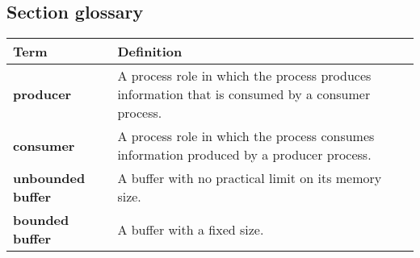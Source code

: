 \subsection*{Section glossary}
\centering
\begin{tabular}{>{\raggedright}p{} >{\raggedright\arraybackslash}p{}}
\toprule
\textbf{Term} & \textbf{Definition} \\
\midrule
\textbf{producer} & A process role in which the process produces information that is consumed by a consumer process. \\
\textbf{consumer} & A process role in which the process consumes information produced by a producer process. \\
\textbf{unbounded buffer} & A buffer with no practical limit on its memory size. \\
\textbf{bounded buffer} & A buffer with a fixed size. \\
\bottomrule
\end{tabular}
\vspace{\baselineskip}
